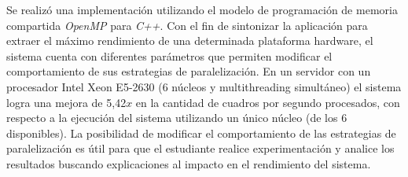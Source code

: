 Se realizó una implementación utilizando el modelo de programación de memoria
compartida \emph{OpenMP} para \emph{C++}. Con el fin de sintonizar la aplicación
para extraer el máximo rendimiento de una determinada plataforma hardware, el
sistema cuenta con diferentes parámetros que permiten modificar el
comportamiento de sus estrategias de paralelización. En un servidor con un
procesador Intel Xeon E5-2630 (6 núcleos y multithreading simultáneo) el sistema
logra una mejora de 5,42$x$ en la cantidad de cuadros por segundo procesados,
con respecto a la ejecución del sistema utilizando un único núcleo (de los 6
disponibles). La posibilidad de modificar el comportamiento de las estrategias
de paralelización es útil para que el estudiante realice experimentación y
analice los resultados buscando explicaciones al impacto en el rendimiento del
sistema.

\vfill
\pagebreak
